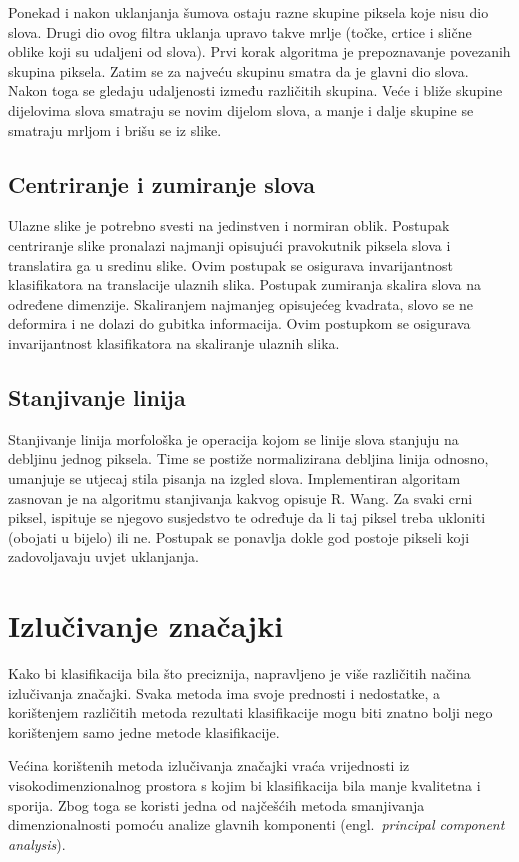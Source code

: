 \documentclass[a4paper,twocolumn,dvipdfm]{article}
\begin{document}
Ponekad i nakon uklanjanja šumova ostaju razne skupine piksela koje nisu dio
slova. Drugi dio ovog filtra uklanja upravo takve mrlje (točke, crtice i slične
oblike koji su udaljeni od slova). Prvi korak algoritma je prepoznavanje
povezanih skupina piksela. Zatim se za najveću skupinu smatra da je glavni dio
slova. Nakon toga se gledaju udaljenosti između različitih skupina. Veće i
bliže skupine dijelovima slova smatraju se novim dijelom slova, a manje i dalje
skupine se smatraju mrljom i brišu se iz slike.

\subsection{Centriranje i zumiranje slova}
Ulazne slike je potrebno svesti na jedinstven i normiran oblik. Postupak 
centriranje slike pronalazi najmanji opisujući pravokutnik piksela slova  
i translatira ga u sredinu slike. Ovim postupak se osigurava invarijantnost
klasifikatora na translacije ulaznih slika. Postupak zumiranja skalira slova 
na određene dimenzije. Skaliranjem najmanjeg opisujećeg kvadrata, slovo se 
ne deformira i ne dolazi do gubitka informacija. Ovim postupkom se osigurava 
invarijantnost klasifikatora na skaliranje ulaznih slika.

\subsection{Stanjivanje linija}
Stanjivanje linija morfološka je operacija kojom se linije slova stanjuju na
debljinu jednog piksela. Time se postiže normalizirana debljina linija odnosno,
umanjuje se utjecaj stila pisanja na izgled slova. Implementiran algoritam
zasnovan je na algoritmu stanjivanja kakvog opisuje R.
Wang\cite{Wang2004Online}. Za svaki crni piksel, ispituje se njegovo susjedstvo
te određuje da li taj piksel treba ukloniti (obojati u bijelo) ili ne. Postupak
se ponavlja dokle god postoje pikseli koji zadovoljavaju uvjet uklanjanja.

\section{Izlučivanje značajki}
Kako bi klasifikacija bila što preciznija, napravljeno je više različitih načina
izlučivanja značajki. Svaka metoda ima svoje prednosti i nedostatke, a
korištenjem različitih metoda rezultati klasifikacije mogu biti znatno bolji
nego korištenjem samo jedne metode klasifikacije.

Većina korištenih metoda izlučivanja značajki vraća vrijednosti iz
visokodimenzionalnog prostora s kojim bi klasifikacija bila manje kvalitetna i
sporija. Zbog toga se koristi jedna od najčešćih metoda smanjivanja
dimenzionalnosti pomoću analize glavnih komponenti (engl.\ \emph{principal
component analysis}).
\end{document}
